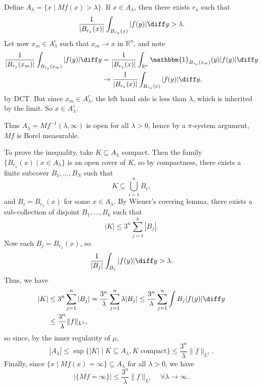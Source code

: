 \documentclass[12pt]{article}
\begin{document}
\begin{proofbox}
	Define $A_\lambda = \{x \mid M f(x) > \lambda\}$. If $x \in A_\lambda$, then there exists $r_x$ such that
	\[
	\frac{1}{|B_{r_x}(x)|} \int_{B_{r_x}(x)} |f(y)| \diff y > \lambda.
	\]
	Let now $x_m \in A_\lambda^{c}$ such that $x_m \to x$ in $\mathbb{R}^n$, and note
	\begin{align*}
		\frac{1}{|B_{r_x}(x_m)|} \int_{B_{r_x}(x_m)} |f(y)| \diff y &= \frac{1}{|B_{r_x}(x)|} \int_{\mathbb{R}^n} \mathbbm{1}_{B_{r_x}(x_m)}(y) |f(y)| \diff y \\
									    &\to \frac{1}{|B_{r_x}(x)|} \int_{B_{r_x}(x)} |f(y)| \diff y,
	\end{align*}
	by DCT. But since $x_m \in A_\lambda^{c}$, the left hand side is less than $\lambda$, which is inherited by the limit. So $x \in A_\lambda^{c}$.

	Thus $A_\lambda = Mf^{-1}(\lambda, \infty)$ is open for all $\lambda > 0$, hence by a $\pi$-system argument, $Mf$ is Borel measurable.

	To prove the inequality, take $K \subseteq A_\lambda$ compact. Then the family $\{B_{r_x}(x) \mid x \in A_\lambda\}$ is an open cover of $K$, so by compactness, there exists a finite subcover $B_1, \ldots,B_N$ such that
	\[
	K \subseteq \bigcup_{i = 1}^n B_i,
	\]
	and $B_i = B_{r_x}(x)$ for some $x \in A_\lambda$. By Wiener's covering lemma, there exists a sub-collection of disjoint $B_1, \ldots, B_k$ such that
	\[
	|K| \leq 3^n \sum_{j = 1}^k |B_j|.
	\]
	Now each $B_j = B_{r_x}(x)$, so
	\[
	\frac{1}{|B_j|} \int_{B_j} |f(y)|\diff y > \lambda.
	\]
	Thus, we have
	\begin{align*}
		|K| & \leq 3^n \sum_{j = 1}^n |B_j| = \frac{3^n}{\lambda} \sum_{j = 1}^n \lambda |B_j| \leq \frac{3^n}{\lambda} \sum_{j = 1}^n \int B_j |f(y)| \diff y \\
		    &\leq \frac{3^n}{\lambda} \|f\|_{L^1},
	\end{align*}
	so since, by the inner regularity of $\mu$,
	\[
		|A_\lambda| \leq \sup\{|K| \mid K \subseteq A_\lambda, K \text{ compact}\} \leq \frac{3^n}{\lambda} \|f\|_{L^1}.
	\]
	Finally, since $\{x \mid M f(x) = \infty\} \subseteq A_\lambda$ for all $\lambda > 0$, we have
	\[
		|\{Mf = \infty\}| \leq \frac{3^n}{\lambda} \|f\|_{L^1} \quad \forall \lambda \to \infty.
	\]
\end{proofbox}
\end{document}
